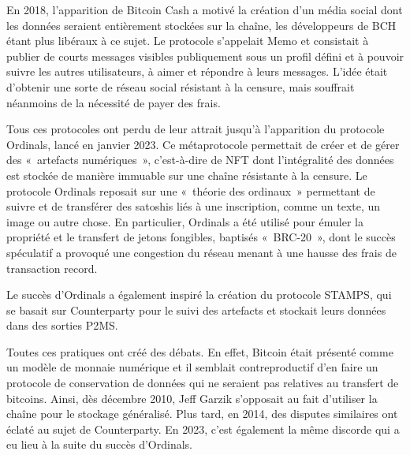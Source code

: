 En 2018, l'apparition de Bitcoin Cash a motivé la création d'un média social dont les données seraient entièrement stockées sur la chaîne, les développeurs de BCH étant plus libéraux à ce sujet. Le protocole s'appelait Memo et consistait à publier de courts messages visibles publiquement sous un profil défini et à pouvoir suivre les autres utilisateurs, à aimer et répondre à leurs messages. L'idée était d'obtenir une sorte de réseau social résistant à la censure, mais souffrait néanmoins de la nécessité de payer des frais. 

Tous ces protocoles ont perdu de leur attrait jusqu'à l'apparition du protocole Ordinals, lancé en janvier 2023. Ce métaprotocole permettait de créer et de gérer des «~artefacts numériques~», c'est-à-dire de NFT dont l'intégralité des données est stockée de manière immuable sur une chaîne résistante à la censure. Le protocole Ordinals reposait sur une «~théorie des ordinaux~» permettant de suivre et de transférer des satoshis liés à une inscription, comme un texte, un image ou autre chose. En particulier, Ordinals a été utilisé pour émuler la propriété et le transfert de jetons fongibles, baptisés «~BRC-20~», dont le succès spéculatif a provoqué une congestion du réseau menant à une hausse des frais de transaction record.

Le succès d'Ordinals a également inspiré la création du protocole STAMPS, qui se basait sur Counterparty pour le suivi des artefacts et stockait leurs données dans des sorties P2MS.

Toutes ces pratiques ont créé des débats. En effet, Bitcoin était présenté comme un modèle de monnaie numérique et il semblait contreproductif d'en faire un protocole de conservation de données qui ne seraient pas relatives au transfert de bitcoins. Ainsi, dès décembre 2010, Jeff Garzik s'opposait au fait d'utiliser la chaîne pour le stockage généralisé. Plus tard, en 2014, des disputes similaires ont éclaté au sujet de Counterparty. En 2023, c'est également la même discorde qui a eu lieu à la suite du succès d'Ordinals.

